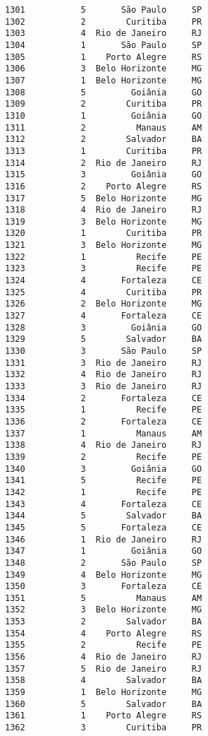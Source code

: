 \documentclass[11pt]{article}
\begin{document}
\begin{Verbatim}[commandchars=\\\{\}]
1301           5       São Paulo     SP  
1302           2        Curitiba     PR  
1303           4  Rio de Janeiro     RJ  
1304           1       São Paulo     SP  
1305           1    Porto Alegre     RS  
1306           3  Belo Horizonte     MG  
1307           1  Belo Horizonte     MG  
1308           5         Goiânia     GO  
1309           2        Curitiba     PR  
1310           1         Goiânia     GO  
1311           2          Manaus     AM  
1312           2        Salvador     BA  
1313           1        Curitiba     PR  
1314           2  Rio de Janeiro     RJ  
1315           3         Goiânia     GO  
1316           2    Porto Alegre     RS  
1317           5  Belo Horizonte     MG  
1318           4  Rio de Janeiro     RJ  
1319           3  Belo Horizonte     MG  
1320           1        Curitiba     PR  
1321           3  Belo Horizonte     MG  
1322           1          Recife     PE  
1323           3          Recife     PE  
1324           4       Fortaleza     CE  
1325           4        Curitiba     PR  
1326           2  Belo Horizonte     MG  
1327           4       Fortaleza     CE  
1328           3         Goiânia     GO  
1329           5        Salvador     BA  
1330           3       São Paulo     SP  
1331           3  Rio de Janeiro     RJ  
1332           4  Rio de Janeiro     RJ  
1333           3  Rio de Janeiro     RJ  
1334           2       Fortaleza     CE  
1335           1          Recife     PE  
1336           2       Fortaleza     CE  
1337           1          Manaus     AM  
1338           4  Rio de Janeiro     RJ  
1339           2          Recife     PE  
1340           3         Goiânia     GO  
1341           5          Recife     PE  
1342           1          Recife     PE  
1343           4       Fortaleza     CE  
1344           5        Salvador     BA  
1345           5       Fortaleza     CE  
1346           1  Rio de Janeiro     RJ  
1347           1         Goiânia     GO  
1348           2       São Paulo     SP  
1349           4  Belo Horizonte     MG  
1350           3       Fortaleza     CE  
1351           5          Manaus     AM  
1352           3  Belo Horizonte     MG  
1353           2        Salvador     BA  
1354           4    Porto Alegre     RS  
1355           2          Recife     PE  
1356           4  Rio de Janeiro     RJ  
1357           5  Rio de Janeiro     RJ  
1358           4        Salvador     BA  
1359           1  Belo Horizonte     MG  
1360           5        Salvador     BA  
1361           1    Porto Alegre     RS  
1362           3        Curitiba     PR  

\end{Verbatim}
\end{document}
